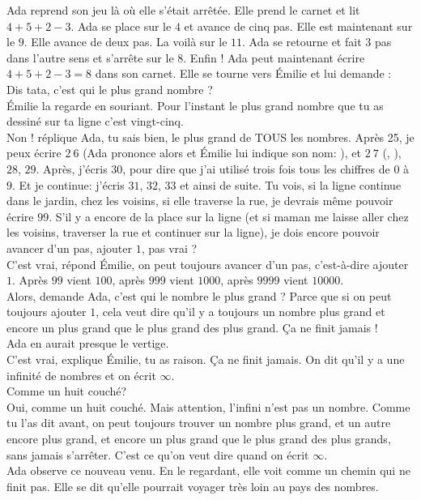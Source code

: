 Ada reprend son jeu là où elle s’était arrêtée. 
Elle prend le carnet et lit $4 + 5 + 2 - 3$. 
Ada se place sur le $4$ et avance de cinq pas. 
Elle est maintenant sur le $9$. 
Elle avance de deux pas. La voilà sur le $11$. 
Ada se retourne et fait $3$ pas dans l’autre sens et s’arrête sur le $8$.
Enfin ! Ada peut maintenant écrire $4 + 5 + 2 - 3 = 8$ dans son carnet.
Elle se tourne vers Émilie et lui demande :\\
\guillemotleft Dis tata, c’est qui le plus grand nombre ? \guillemotright\\
Émilie la regarde en souriant.
\guillemotleft Pour l’instant le plus grand nombre que tu as dessiné sur ta ligne c’est vingt-cinq.\\
\mdash Non ! réplique Ada, tu sais bien, le plus grand de TOUS les nombres. Après 25, je peux écrire $2~6$ (Ada prononce alors  et Émilie lui indique son nom: ), et $2~7$ (, ), $28$, $29$. Après, j’écris $30$, pour dire que j’ai utilisé trois fois tous les chiffres de $0$ à $9$. Et je continue: j’écris $31$, $32$, $33$ et ainsi de suite. Tu vois, si la ligne continue dans le jardin, chez les voisins, si elle traverse la rue, je devrais même pouvoir écrire $99$. S'il y a encore de la place sur la ligne (et si maman me laisse aller chez les voisins, traverser la rue et continuer sur la ligne), je dois encore pouvoir avancer d’un pas, ajouter $1$, pas vrai ?\\
\mdash C’est vrai, répond Émilie, on peut toujours avancer d’un pas, c’est-à-dire ajouter $1$. Après $99$ vient $100$, après $999$ vient $1000$, après $9999$ vient $10000$.\\
\mdash Alors, demande Ada, c’est qui le nombre le plus grand ? Parce que si on peut toujours ajouter $1$, cela veut dire qu’il y a toujours un nombre plus grand et encore un plus grand que le plus grand des plus grand. Ça ne finit jamais ! \guillemotright\\ 
Ada en aurait presque le vertige. \\
\guillemotleft C’est vrai, explique Émilie, tu as raison. Ça ne finit jamais. On dit qu’il y a une infinité de nombres et on écrit $\infty$.\\
\mdash Comme un huit couché?\\
\mdash Oui, comme un huit couché. Mais attention, l’infini n’est pas un nombre. Comme tu l’as dit avant, on peut toujours trouver un nombre plus grand, et un autre encore plus grand, et encore un plus grand que le plus grand des plus grands, sans jamais s'arrêter. C’est ce qu’on veut dire quand on écrit $\infty$. \guillemotright\\
Ada observe ce nouveau venu. En le regardant, elle voit comme un chemin qui ne finit pas. Elle se dit qu’elle pourrait voyager très loin au pays des nombres.

